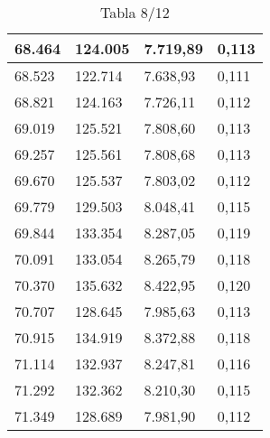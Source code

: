 \begin{table}[H]
{\begin{tabular}{| l | l | l |l |}
68.464	&	124.005	&	7.719,89	&	0,113	\\ \hline
68.523	&	122.714	&	7.638,93	&	0,111	\\ \hline
68.821	&	124.163	&	7.726,11	&	0,112	\\ \hline
69.019	&	125.521	&	7.808,60	&	0,113	\\ \hline
69.257	&	125.561	&	7.808,68	&	0,113	\\ \hline
69.670	&	125.537	&	7.803,02	&	0,112	\\ \hline
69.779	&	129.503	&	8.048,41	&	0,115	\\ \hline
69.844	&	133.354	&	8.287,05	&	0,119	\\ \hline
70.091	&	133.054	&	8.265,79	&	0,118	\\ \hline
70.370	&	135.632	&	8.422,95	&	0,120	\\ \hline
70.707	&	128.645	&	7.985,63	&	0,113	\\ \hline
70.915	&	134.919	&	8.372,88	&	0,118	\\ \hline
71.114	&	132.937	&	8.247,81	&	0,116	\\ \hline
71.292	&	132.362	&	8.210,30	&	0,115	\\ \hline
71.349	&	128.689	&	7.981,90	&	0,112	\\ \hline
  \end{tabular}
  \caption*{Tabla 8/12}
}
\end{table}
